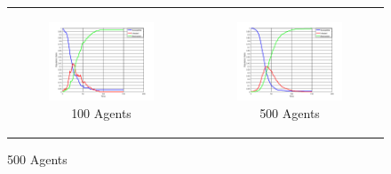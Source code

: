 \begin{figure}
\begin{center}
	\begin{tabular}{c c}
		\begin{subfigure}[b]{0.3\textwidth}
			\centering
			\includegraphics[width=1\textwidth, angle=0]{./fig/step1_randmonad/SIR_100agents_150t_1dt.png}
			\caption{100 Agents}
			\label{fig:sir_abs_approximating_1dt_100agents}
		\end{subfigure}
    	&
		\begin{subfigure}[b]{0.3\textwidth}
			\centering
			\includegraphics[width=1\textwidth, angle=0]{./fig/step1_randmonad/SIR_500agents_150t_1dt.png}
			\caption{500 Agents}
			\label{fig:sir_abs_approximating_1dt_500agents}
		\end{subfigure}
    	

\end{tabular}
\end{center}
\end{figure}
